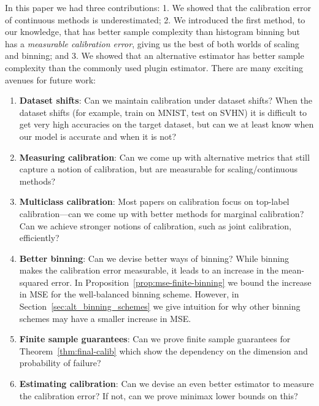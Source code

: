 In this paper we had three contributions: 1. We showed that the calibration error of continuous methods is underestimated; 2. We introduced the first method, to our knowledge, that has better sample complexity than histogram binning but has a \emph{measurable calibration error}, giving us the best of both worlds of scaling and binning; and 3. We showed that an alternative estimator has better sample complexity than the commonly used plugin estimator.
There are many exciting avenues for future work:
\begin{enumerate}
\item \textbf{Dataset shifts}: Can we maintain calibration under dataset shifts? When the dataset shifts (for example, train on MNIST, test on SVHN) it is difficult to get very high accuracies on the target dataset, but can we at least know when our model is accurate and when it is not?
\item \textbf{Measuring calibration}: Can we come up with alternative metrics that still capture a notion of calibration, but are measurable for scaling/continuous methods?
\item \textbf{Multiclass calibration}: Most papers on calibration focus on top-label calibration---can we come up with better methods for marginal calibration? Can we achieve stronger notions of calibration, such as joint calibration, efficiently? 
\item \textbf{Better binning}: Can we devise better ways of binning? While binning makes the calibration error measurable, it leads to an increase in the mean-squared error. In Proposition~\ref{prop:mse-finite-binning} we bound the increase in MSE for the well-balanced binning scheme. However, in Section~\ref{sec:alt_binning_schemes} we give intuition for why other binning schemes may have a smaller increase in MSE.
\item \textbf{Finite sample guarantees}: Can we prove finite sample guarantees for Theorem~\ref{thm:final-calib} which show the dependency on the dimension and probability of failure?
\item \textbf{Estimating calibration}: Can we devise an even better estimator to measure the calibration error? If not, can we prove minimax lower bounds on this?
\end{enumerate}

